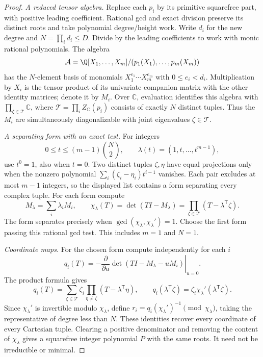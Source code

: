 \begin{proof}
\emph{A reduced tensor algebra.} Replace each $p_i$ by its primitive
squarefree part, with positive leading coefficient. Rational gcd and exact
division preserve its distinct roots and take polynomial degree/height work.
Write $d_i$ for the new degree and $N=\prod_i d_i\le D$. Divide by the
leading coefficients to work with monic rational polynomials. The algebra
\[
 \mathcal A=\Q[X_1,\dots,X_m]/(p_1(X_1),\dots,p_m(X_m))
\]
has the $N$-element basis of monomials $X_1^{e_1}\cdots X_m^{e_m}$ with
$0\le e_i<d_i$. Multiplication by $X_i$ is the tensor product of its
univariate companion matrix with the other identity matrices; denote it by
$M_i$. Over $\mathbb C$, evaluation identifies this algebra with
$\prod_{\zeta\in\mathcal T}\mathbb C$, where
$\mathcal T=\prod_i Z_{\mathbb C}(p_i)$ consists of exactly $N$ distinct
tuples. Thus the $M_i$ are simultaneously diagonalizable with joint
eigenvalues $\zeta\in\mathcal T$.

\emph{A separating form with an exact test.} For integers
\[
 0\le t\le(m-1)\binom N2,
 \qquad \lambda(t)=(1,t,\dots,t^{m-1}),
\]
use $t^0=1$, also when $t=0$. Two distinct tuples $\zeta,\eta$ have equal
projections only when the nonzero polynomial
$\sum_i(\zeta_i-\eta_i)t^{i-1}$ vanishes. Each pair excludes at most
$m-1$ integers, so the displayed list contains a form separating every
complex tuple. For each form compute
\[
 M_\lambda=\sum_i\lambda_iM_i,\qquad
 \chi_\lambda(T)=\det(TI-M_\lambda)
 =\prod_{\zeta\in\mathcal T}(T-\lambda^{\mathsf T}\zeta).
\]
The form separates precisely when
$\gcd(\chi_\lambda,\chi_\lambda')=1$. Choose the first form passing this
rational gcd test. This includes $m=1$ and $N=1$.

\emph{Coordinate maps.} For the chosen form compute independently for
each $i$
\[
 q_i(T)=-\left.\frac{\partial}{\partial u}
       \det(TI-M_\lambda-uM_i)\right|_{u=0}.
\]
The product formula gives
\[
 q_i(T)=\sum_{\zeta\in\mathcal T}\zeta_i
             \prod_{\eta\ne\zeta}(T-\lambda^{\mathsf T}\eta),
 \qquad
 q_i(\lambda^{\mathsf T}\zeta)
   =\zeta_i\chi_\lambda'(\lambda^{\mathsf T}\zeta).
\]
Since $\chi_\lambda'$ is invertible modulo $\chi_\lambda$, define
$r_i=q_i(\chi_\lambda')^{-1}\pmod{\chi_\lambda}$, taking the representative
of degree less than $N$. These identities recover every coordinate of every
Cartesian tuple. Clearing a positive denominator and removing the content
of $\chi_\lambda$ gives a squarefree integer polynomial $P$ with the same
roots. It need not be irreducible or minimal.


\end{proof}
